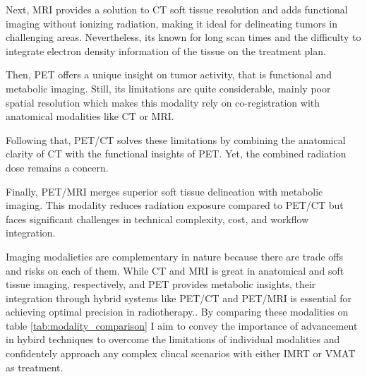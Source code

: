 \documentclass[11pt]{article} %
\begin{document}
Next, MRI provides a solution to CT soft tissue resolution and adds functional imaging without ionizing radiation, making it ideal for delineating tumors in challenging areas.  Nevertheless, its known for long scan times and the difficulty to integrate electron density information of the tissue on the treatment plan. 

Then, PET offers a unique insight on tumor activity, that is functional and metabolic imaging. Still, its limitations are quite considerable, mainly poor spatial resolution which makes this modality rely on co-registration with anatomical modalities like CT or MRI. 

Following that, PET/CT solves these limitations by combining the anatomical clarity of CT with the functional insights of PET. Yet, the combined radiation dose remains a concern. 

Finally, PET/MRI merges superior soft tissue delineation with metabolic imaging. This modality reduces radiation exposure compared to PET/CT but faces significant challenges in technical complexity, cost, and workflow integration.

Imaging modalieties are complementary in nature because there are trade offs and risks on each of them. While CT and MRI is great in anatomical and soft tissue imaging, respectively, and PET provides metabolic insights, their integration through hybrid systems like PET/CT and PET/MRI is essential for achieving optimal precision in radiotherapy.\cite{decazes2021, yan2024}. By comparing these modalities on table \ref{tab:modality_comparison} I aim to convey the importance of advancement in hybird techniques to overcome the limitations of individual modalities and confidentely approach any complex clincal scenarios with either IMRT or VMAT as treatment.
\end{document}
